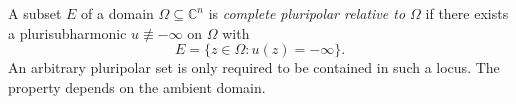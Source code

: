 
A subset $E$ of a domain $\Omega\subseteq\mathbb C^n$ is \emph{complete pluripolar relative to $\Omega$} if there exists a plurisubharmonic $u\not\equiv-\infty$ on $\Omega$ with
\[
E=\{z\in\Omega:u(z)=-\infty\}.
\]
An arbitrary pluripolar set is only required to be contained in such a locus. The property depends on the ambient domain.
